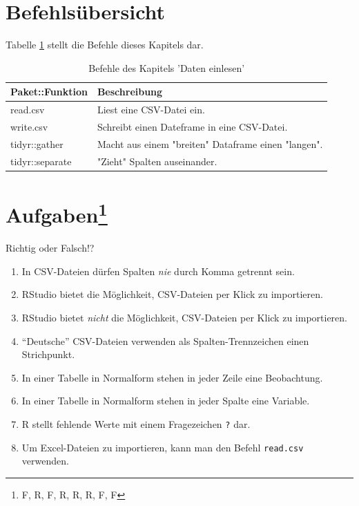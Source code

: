 \documentclass[12pt,ngerman,]{book}
\providecommand{\tightlist}{%
  \setlength{\itemsep}{0pt}\setlength{\parskip}{0pt}}
\let\rmarkdownfootnote\footnote%
\def\footnote{\protect\rmarkdownfootnote}
\theoremstyle{definition}
\theoremstyle{definition}
\theoremstyle{remark}
\let\BeginKnitrBlock\begin \let\EndKnitrBlock\end
\begin{document}
\section{Befehlsübersicht}\label{befehlsubersicht-1}

Tabelle \ref{tab:befehle-tidy} stellt die Befehle dieses Kapitels dar.

\begin{table}

\caption{\label{tab:befehle-tidy}Befehle des Kapitels 'Daten einlesen'}
\centering
\begin{tabular}[t]{l|l}
\hline
Paket::Funktion & Beschreibung\\
\hline
read.csv & Liest eine CSV-Datei ein.\\
\hline
write.csv & Schreibt einen Dateframe in eine CSV-Datei.\\
\hline
tidyr::gather & Macht aus einem "breiten" Dataframe einen "langen".\\
\hline
tidyr::separate & "Zieht" Spalten auseinander.\\
\hline
\end{tabular}
\end{table}

\section[Aufgaben]{\texorpdfstring{Aufgaben\footnote{F, R, F, R, R, R,
  F, F}}{Aufgaben}}\label{aufgaben-1}

\BeginKnitrBlock{rmdexercises}
Richtig oder Falsch!?

\begin{enumerate}
\def\labelenumi{\arabic{enumi}.}
\tightlist
\item
  In CSV-Dateien dürfen Spalten \emph{nie} durch Komma getrennt sein.
\item
  RStudio bietet die Möglichkeit, CSV-Dateien per Klick zu importieren.
\item
  RStudio bietet \emph{nicht} die Möglichkeit, CSV-Dateien per Klick zu
  importieren.
\item
  ``Deutsche'' CSV-Dateien verwenden als Spalten-Trennzeichen einen
  Strichpunkt.
\item
  In einer Tabelle in Normalform stehen in jeder Zeile eine Beobachtung.
\item
  In einer Tabelle in Normalform stehen in jeder Spalte eine Variable.
\item
  R stellt fehlende Werte mit einem Fragezeichen \texttt{?} dar.
\item
  Um Excel-Dateien zu importieren, kann man den Befehl \texttt{read.csv}
  verwenden.
\end{enumerate}
\EndKnitrBlock{rmdexercises}
\end{document}
